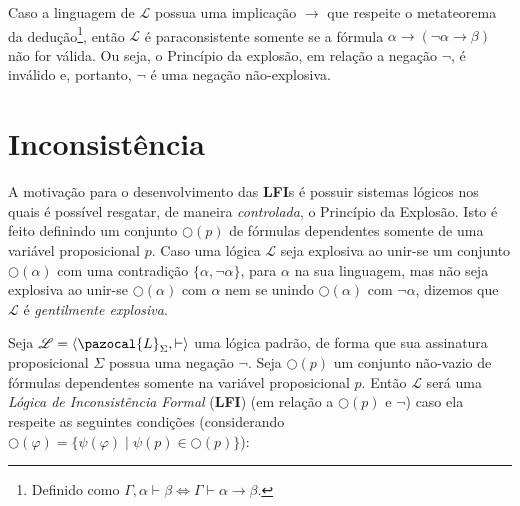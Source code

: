Caso a linguagem de $\mathcal{L}$ possua uma implicação $\rightarrow$ que respeite o metateorema da dedução\footnote{Definido como $\Gamma, \alpha \vdash \beta \Longleftrightarrow \Gamma\vdash \alpha \rightarrow \beta$.}, então $\mathcal{L}$ é paraconsistente somente se a fórmula $\alpha \rightarrow (\neg \alpha \rightarrow \beta)$ não for válida. Ou seja, o Princípio da explosão, em relação a negação $\neg$, é inválido e, portanto, $\neg$ é uma negação não-explosiva.

\section{Inconsistência}
A motivação para o desenvolvimento das \textbf{LFI}s é possuir sistemas lógicos  nos quais é possível resgatar, de maneira \textit{controlada}, o Princípio da Explosão. Isto é feito definindo um conjunto $\bigcirc(p)$ de fórmulas dependentes somente de uma variável proposicional $p$. Caso uma lógica $\mathcal{L}$ seja explosiva ao unir-se um conjunto $\bigcirc(\alpha)$ com uma contradição $\{\alpha, \neg \alpha\}$, para  $\alpha$ na sua linguagem, mas não seja explosiva ao unir-se $\bigcirc(\alpha)$ com $\alpha$ nem se unindo $\bigcirc(\alpha)$ com $\neg \alpha$, dizemos que $\mathcal{L}$ é \textit{gentilmente explosiva}. 

\begin{definicao}
    \label{def:lfi}
    Seja $\mathcal{L} = \langle \pazocal{L}_{\Sigma}, \vdash \rangle$ uma lógica padrão, de forma que sua assinatura proposicional $\Sigma$ possua uma negação $\neg$. Seja $\bigcirc(p)$ um conjunto não-vazio de fórmulas dependentes somente na variável proposicional $p$. Então $\mathcal{L}$ será uma \textit{Lógica de Inconsistência Formal} (\textbf{LFI}) (em relação a $\bigcirc(p)$ e $\neg$) caso ela respeite as seguintes condições (considerando $\bigcirc(\varphi) = \{\psi(\varphi) \; | \; \psi(p) \in \bigcirc(p)\}$): 


\end{definicao}


